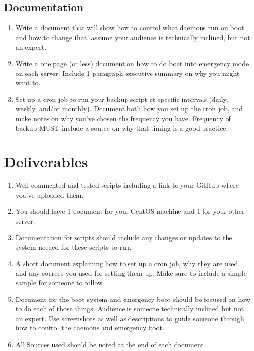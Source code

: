 \documentclass[12pt]{article}
\begin{document}
    \subsection*{Documentation}
    \begin{enumerate}   
        \item Write a document that will show how to control what daemons run on boot and how to change that.  assume your audience is technically inclined, but not an expert.
        \item Write a one page (or less) document on how to do boot into emergency mode on each server. Include 1 paragraph executive summary on why you might want to. 
        \item Set up a cron job to run your backup script at specific intervals (daily, weekly, and/or monthly). Document both how you set up the cron job, and make notes on why you've chosen the frequency you have.  Frequency of backup MUST include a source on why that timing is a good practice. 

    \end{enumerate}



\section*{Deliverables}
\begin{enumerate}
    \item Well commented and tested scripts including a link to your GitHub where you've uploaded them.
    \item You should have 1 document for your CentOS machine and 1 for your other server.
    \item  Documentation for scripts should include any changes or updates to the system needed for these scripts to run.
    \item A short document explaining how to set up a cron job, why they are used, and any sources you used for setting them up. Make sure to include a simple sample for someone to follow
    \item Document for the boot system and emergency boot should be focused on how to do each of those things. Audience is someone technically inclined but not an expert.  Use screenshots as well as descriptions to guide someone through how to control the daemons and emergency boot.
    \item All Sources used should be noted at the end of each document.  
\end{enumerate}
\end{document}
